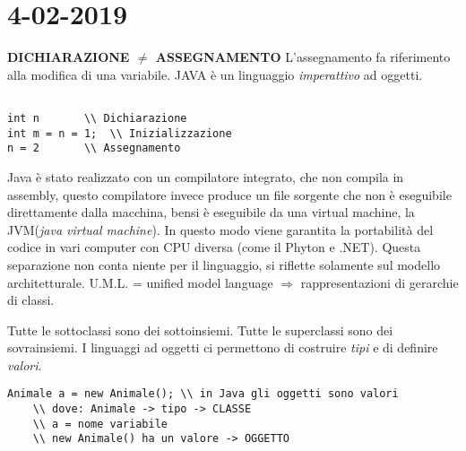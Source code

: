 

\newpage
\section{4-02-2019}
\par
\textbf{DICHIARAZIONE $\neq$ ASSEGNAMENTO} \newline
L'assegnamento fa riferimento alla modifica di una variabile. \newline
JAVA è un linguaggio \textit{imperattivo} ad oggetti.

\begin{lstlisting}[basicstyle=\small,]

int n		\\ Dichiarazione
int m = n = 1; 	\\ Inizializzazione
n = 2 		\\ Assegnamento

\end{lstlisting}

Java è stato realizzato con un compilatore integrato, che non compila in assembly, questo compilatore invece produce un file sorgente che non è eseguibile direttamente dalla macchina, bensi è eseguibile da una virtual machine, la JVM(\textit{java virtual machine}). In questo modo viene garantita la portabilità del codice in vari computer con CPU diversa (come il Phyton e .NET). \newline
Questa separazione non conta niente per il linguaggio, si riflette solamente sul modello architetturale. \newline
U.M.L. = unified model language $\Rightarrow$ rappresentazioni di gerarchie di classi. \newline

   
Tutte le sottoclassi sono dei sottoinsiemi. \newline
Tutte le superclassi sono dei sovrainsiemi. \newline
I linguaggi ad oggetti ci permettono di costruire \textit{tipi} e di definire \textit{valori}. \newline 

\begin{lstlisting}[basicstyle=\small,]
	Animale a = new Animale(); \\ in Java gli oggetti sono valori
	\\ dove: Animale -> tipo -> CLASSE
	\\ a = nome variabile
	\\ new Animale() ha un valore -> OGGETTO
\end{lstlisting}


